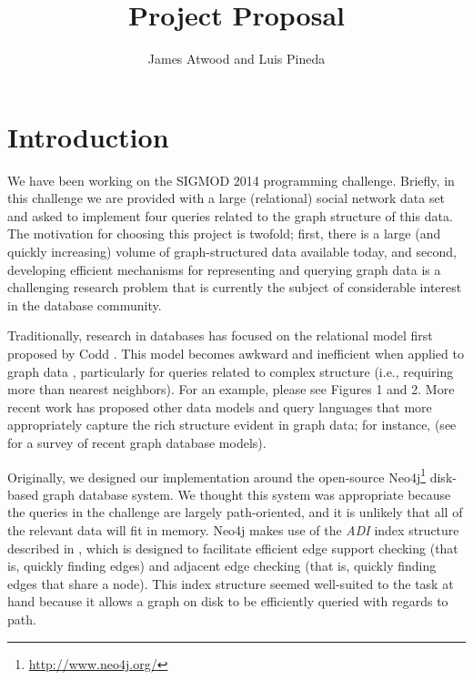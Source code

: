 \documentclass{article}
\title{Project Proposal}
\author{
James Atwood and Luis Pineda \\ %
}
\begin{document}
\maketitle

\section{Introduction}
We have been working on the SIGMOD 2014 programming challenge.  Briefly,
in this challenge we are provided with a large (relational) social
network data set and asked to implement four queries related to the
graph structure of this data.  The motivation for choosing this
project is twofold; first, there is a large (and quickly increasing)
volume of graph-structured data available today, and second,
developing efficient mechanisms for representing and querying graph
data is a challenging research problem that is currently the subject
of considerable interest in the database community.

Traditionally, research in databases has focused on the relational
model first proposed by Codd \cite{codd1970relational}.  This model
becomes awkward and inefficient when applied to graph data
\cite{rodriguez2011graph}, particularly for queries related to
complex structure (i.e., requiring more than nearest neighbors).  For
an example, please see \cite{he2008graphs} Figures 1 and 2.  More
recent work has proposed other data models and query languages that
more appropriately capture the rich structure evident in graph data;
for instance,
\cite{he2008graphs,sun2012efficient,low2010graphlab} (see
\cite{angles2008survey} for a survey of recent graph database
models).  


Originally, we designed our implementation around the open-source
Neo4j\footnote{\url{http://www.neo4j.org/}} disk-based graph database
system.  We thought this system was appropriate because the queries in
the challenge are largely path-oriented, and it is unlikely that all
of the relevant data will fit in memory.  Neo4j makes use of the
\emph{ADI} index structure \cite[Chapter~6]{IanRobinson:2013ul}
described in \cite{wang2004scalable}, which is designed to facilitate
efficient edge support checking (that is, quickly finding edges) and
adjacent edge checking (that is, quickly finding edges that share a
node).  This index structure seemed well-suited to the task at hand
because it allows a graph on disk to be efficiently queried with
regards to path.
\end{document}
